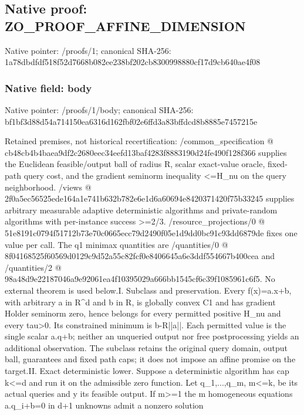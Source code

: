 \documentclass[10pt,a4paper]{article}
\begin{document}
\subsection{Native proof: ZO\_\allowbreak{}PROOF\_\allowbreak{}AFFINE\_\allowbreak{}DIMENSION}
Native pointer: /proofs/1; canonical SHA-256: 1a78dbdfdf518f52d7668b082ee238bf202cb8300998880cf17d9cb640ae4f08

\subsubsection{Native field: body}
Native pointer: /proofs/1/body; canonical SHA-256: bf1bf3d88d54a714150ea6316d162fbf02e6ffd3a83bffdcd8b8885e7457215e

\begingroup\raggedright\sloppy Retained premises,\allowbreak{} not historical recertification:\allowbreak{} /\allowbreak{}common\_\allowbreak{}specification @ cb48cb4b4baea9df2c2680eec34eefd13baf4283f8883190d24fe490f128f366 supplies the Euclidean feasible/\allowbreak{}output ball of radius R,\allowbreak{} scalar exact-value oracle,\allowbreak{} fixed-path query cost,\allowbreak{} and the gradient seminorm inequality <=\allowbreak{}H\_\allowbreak{}nu on the query neighborhood. /\allowbreak{}views @ 2f0a5ec56525ede164a1e741b632b782e6e1d6a60694e8420371420f75b33245 supplies arbitrary measurable adaptive deterministic algorithms and private-random algorithms with per-instance success >=\allowbreak{}2/\allowbreak{}3. /\allowbreak{}resource\_\allowbreak{}projections/\allowbreak{}0 @ 51e8191c0794f51712b73e70c0665ecc79d2490f05e1d9dd0bc91c93dd6879de fixes one value per call. The q1 minimax quantities are /\allowbreak{}quantities/\allowbreak{}0 @ 8f04168525f60569d0129c9d52a55c82fcf0e8406645a6e3ddf554667b400cea and /\allowbreak{}quantities/\allowbreak{}2 @ 98a48d9e22187046a9e92061ea4f10395029a666bb1545cf6c39f1085961c6f5. No external theorem is used below.\newline{}\newline{}I. Subclass and preservation. Every f(x)=\allowbreak{}a.x+b,\allowbreak{} with arbitrary a in R\textasciicircum{}d and b in R,\allowbreak{} is globally convex C1 and has gradient Holder seminorm zero,\allowbreak{} hence belongs for every permitted positive H\_\allowbreak{}nu and every tau>0. Its constrained minimum is b-R||a||. Each permitted value is the single scalar a.q+b;\allowbreak{} neither an unqueried output nor free postprocessing yields an additional observation. The subclass retains the original query domain,\allowbreak{} output ball,\allowbreak{} guarantees and fixed path caps;\allowbreak{} it does not impose an affine promise on the target.\newline{}\newline{}II. Exact deterministic lower. Suppose a deterministic algorithm has cap k<=\allowbreak{}d and run it on the admissible zero function. Let q\_\allowbreak{}1,\allowbreak{}...,\allowbreak{}q\_\allowbreak{}m,\allowbreak{} m<=\allowbreak{}k,\allowbreak{} be its actual queries and y its feasible output. If m>=\allowbreak{}1 the m homogeneous equations a.q\_\allowbreak{}i+b=\allowbreak{}0 in d+1 unknowns admit a nonzero solution 
\end{document}
